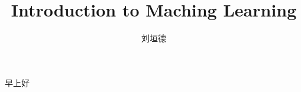 \documentclass[oneside, openany, headings]{book}
\begin{document}
  \author{刘垣德}
  \title{Introduction to Maching Learning}
\tableofcontents
早上好
\end{document}
